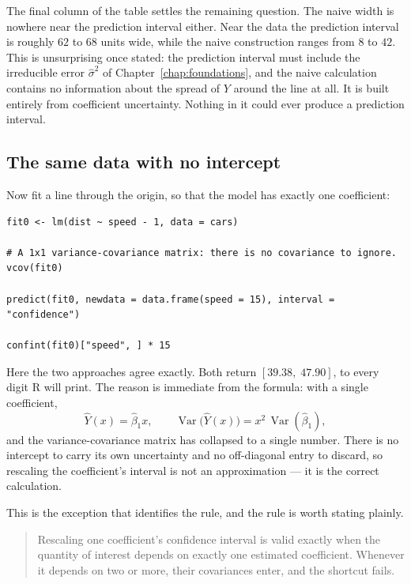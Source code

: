 \documentclass[11pt]{report}
\newcommand{\Var}{\operatorname{Var}}
\begin{document}
The final column of the table settles the remaining question. The naive width is nowhere near the prediction interval either. Near the data the prediction interval is roughly \(62\) to \(68\) units wide, while the naive construction ranges from \(8\) to \(42\). This is unsurprising once stated: the prediction interval must include the irreducible error \(\widehat{\sigma}^2\) of Chapter~\ref{chap:foundations}, and the naive calculation contains no information about the spread of \(Y\) around the line at all. It is built entirely from coefficient uncertainty. Nothing in it could ever produce a prediction interval.

\subsection{The same data with no intercept}

Now fit a line through the origin, so that the model has exactly one coefficient:

\begin{lstlisting}
fit0 <- lm(dist ~ speed - 1, data = cars)

# A 1x1 variance-covariance matrix: there is no covariance to ignore.
vcov(fit0)

predict(fit0, newdata = data.frame(speed = 15), interval = "confidence")

confint(fit0)["speed", ] * 15
\end{lstlisting}

Here the two approaches agree exactly. Both return \([39.38,\;47.90]\), to every digit R will print. The reason is immediate from the formula: with a single coefficient,
\[
\widehat{Y}(x)=\widehat{\beta}_1x,
\qquad
\Var\big(\widehat{Y}(x)\big)=x^2\,\Var(\widehat{\beta}_1),
\]
and the variance-covariance matrix has collapsed to a single number. There is no intercept to carry its own uncertainty and no off-diagonal entry to discard, so rescaling the coefficient's interval is not an approximation --- it is the correct calculation.

This is the exception that identifies the rule, and the rule is worth stating plainly.

\begin{quote}
Rescaling one coefficient's confidence interval is valid exactly when the quantity of interest depends on exactly one estimated coefficient. Whenever it depends on two or more, their covariances enter, and the shortcut fails.
\end{quote}
\end{document}
